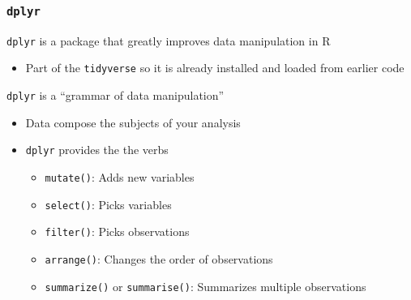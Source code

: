 \documentclass{beamer}\usepackage[]{graphicx}\usepackage[]{color}
\begin{document}
\begin{frame}\frametitle{\texttt{dplyr}}
    \texttt{dplyr} is a package that greatly improves data manipulation in R
    \begin{itemize}
        \item Part of the \texttt{tidyverse} so it is already installed and loaded from earlier code
    \end{itemize}
    \vspace{3ex}
    \texttt{dplyr} is a ``grammar of data manipulation''
    \begin{itemize}
        \item Data compose the subjects of your analysis
        \item \texttt{dplyr} provides the the verbs
        \begin{itemize}
            \item \texttt{mutate()}: Adds new variables
            \item \texttt{select()}: Picks variables
            \item \texttt{filter()}: Picks observations
            \item \texttt{arrange()}: Changes the order of observations
            \item \texttt{summarize()} or \texttt{summarise()}: Summarizes multiple observations
        \end{itemize}
    \end{itemize}
\end{frame}
\end{document}
